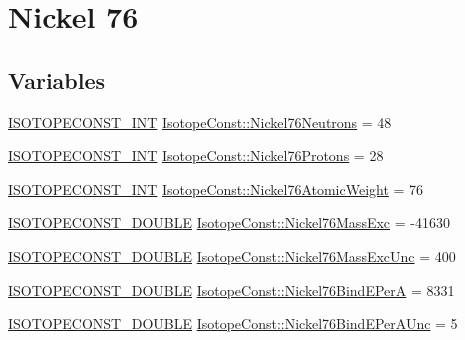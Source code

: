 \hypertarget{group___isotope_const-_nickel-_ni76}{}\section{Nickel 76}
\label{group___isotope_const-_nickel-_ni76}
\subsection*{Variables}
\begin{DoxyCompactItemize}
\item 
\mbox{\hyperlink{group___isotope_const-_macros_ga5f18360b3e99483a35c32d789e62621c}{I\+S\+O\+T\+O\+P\+E\+C\+O\+N\+S\+T\+\_\+\+I\+NT}} \mbox{\hyperlink{group___isotope_const-_nickel-_ni76_gab5372fe87662ad8bc7b01dda99e43bc6}{Isotope\+Const\+::\+Nickel76\+Neutrons}} = 48
\item 
\mbox{\hyperlink{group___isotope_const-_macros_ga5f18360b3e99483a35c32d789e62621c}{I\+S\+O\+T\+O\+P\+E\+C\+O\+N\+S\+T\+\_\+\+I\+NT}} \mbox{\hyperlink{group___isotope_const-_nickel-_ni76_ga26051024f55a95f757f0adf7bec91d83}{Isotope\+Const\+::\+Nickel76\+Protons}} = 28
\item 
\mbox{\hyperlink{group___isotope_const-_macros_ga5f18360b3e99483a35c32d789e62621c}{I\+S\+O\+T\+O\+P\+E\+C\+O\+N\+S\+T\+\_\+\+I\+NT}} \mbox{\hyperlink{group___isotope_const-_nickel-_ni76_ga1b5e0196e18d08d08b0d55655bb0630b}{Isotope\+Const\+::\+Nickel76\+Atomic\+Weight}} = 76
\item 
\mbox{\hyperlink{group___isotope_const-_macros_ga8f45a7272ce02c0b4c65c44636ed719a}{I\+S\+O\+T\+O\+P\+E\+C\+O\+N\+S\+T\+\_\+\+D\+O\+U\+B\+LE}} \mbox{\hyperlink{group___isotope_const-_nickel-_ni76_gad846888f1b21f50af18c71d8b6942255}{Isotope\+Const\+::\+Nickel76\+Mass\+Exc}} = -\/41630
\item 
\mbox{\hyperlink{group___isotope_const-_macros_ga8f45a7272ce02c0b4c65c44636ed719a}{I\+S\+O\+T\+O\+P\+E\+C\+O\+N\+S\+T\+\_\+\+D\+O\+U\+B\+LE}} \mbox{\hyperlink{group___isotope_const-_nickel-_ni76_ga839859a082bd70ec40dd01a853d2f4f3}{Isotope\+Const\+::\+Nickel76\+Mass\+Exc\+Unc}} = 400
\item 
\mbox{\hyperlink{group___isotope_const-_macros_ga8f45a7272ce02c0b4c65c44636ed719a}{I\+S\+O\+T\+O\+P\+E\+C\+O\+N\+S\+T\+\_\+\+D\+O\+U\+B\+LE}} \mbox{\hyperlink{group___isotope_const-_nickel-_ni76_ga9491bd6b6155b66fa6e1d6df71460bba}{Isotope\+Const\+::\+Nickel76\+Bind\+E\+PerA}} = 8331
\item 
\mbox{\hyperlink{group___isotope_const-_macros_ga8f45a7272ce02c0b4c65c44636ed719a}{I\+S\+O\+T\+O\+P\+E\+C\+O\+N\+S\+T\+\_\+\+D\+O\+U\+B\+LE}} \mbox{\hyperlink{group___isotope_const-_nickel-_ni76_gaa28cd33677f1f25ea89dff6afbb66167}{Isotope\+Const\+::\+Nickel76\+Bind\+E\+Per\+A\+Unc}} = 5

\end{DoxyCompactItemize}

